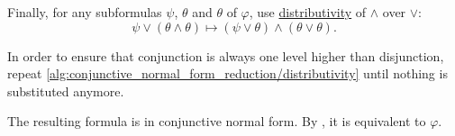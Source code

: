 \begin{algorithm}
\begin{AlgEnum}
     Finally, for any subformulas \( \psi \), \( \theta \) and \( \theta \) of \( \varphi \), use \hyperref[eq:def:distributive_lattice/distributivity]{distributivity} of \( \wedge \) over \( \vee \):
    \begin{equation*}
      \psi \vee (\theta \wedge \theta) \mapsto (\psi \vee \theta) \wedge (\theta \vee \theta).
    \end{equation*}

    In order to ensure that conjunction is always one level higher than disjunction, repeat \ref{alg:conjunctive_normal_form_reduction/distributivity} until nothing is substituted anymore.
  \end{AlgEnum}

  The resulting formula is in conjunctive normal form. By , it is equivalent to \( \varphi \).
\end{algorithm}
